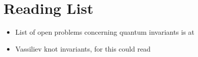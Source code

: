 \documentclass[nobib]{tufte-book} %
\theoremstyle{definition}
\theoremstyle{remark}
\begin{document}
\section{Reading List}

\begin{itemize}
	\item List of open problems concerning quantum invariants
		is at
		\citep{ohtsuki2002problems}
	\item Vassiliev knot invariants, for this could read
		\citep{bar1995vassiliev}
\end{itemize}


\backmatter




\printindex %
\end{document}
